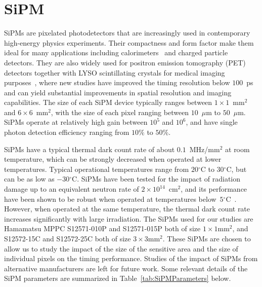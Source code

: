 \section{SiPM}
\label{sec:sipm}

SiPMs are pixelated photodetectors that are increasingly
used in contemporary high-energy physics experiments. Their compactness and form
factor make them ideal for many applications including calorimeters~\cite{Andreev:2004uy}
and charged particle detectors. They are also widely used for positron emission tomography
(PET) detectors together with LYSO scintillating crystals for medical imaging
purposes~\cite{Vandenberghe2016}, where new studies have improved the 
timing resolution below $100$~ps~\cite{LecoqTOFPET} and 
 can yield substantial improvements in spatial resolution and imaging 
 capabilities. The size of each SiPM device typically
ranges between $1\times 1$~$\mathrm{mm}^{2}$ and $6\times 6$~$\mathrm{mm}^{2}$,
with the size of each pixel ranging between $10$~$\mu$m to $50$~$\mu$m. SiPMs operate
at relatively high gain between $10^{5}$ and $10^{6}$, and have single photon detection
efficiency ranging from $10\%$ to $50\%$. 


SiPMs have a typical thermal dark count rate of about
$0.1$~MHz/$\mathrm{mm}^{2}$ at room temperature, which can be strongly decreased
when operated at lower temperatures. Typical operational temperatures range from
$20$$^{\circ}$C to $30$$^{\circ}$C, but can be as low as $-30$$^{\circ}$C. SiPMs have
been tested for the impact of radiation damage up to an equivalent neutron rate
of $2\times10^{14}$~$\mathrm{cm}^{2}$, and its performance have been shown to be
robust when operated at temperatures 
below~$5$$^{\circ}$C~\cite{SiPMIrradiated1,SiPMIrradiated2}. However, when operated
at the same temperature, the thermal dark count rate increases significantly
with large irradiation. The SiPMs used for our studies are Hamamatsu MPPC
S12571-010P and S12571-015P both of size $1\times1\mathrm{mm}^{2}$, and
S12572-15C and S12572-25C both of size $3\times3\mathrm{mm}^{2}$. These SiPMs
are chosen to allow us to study the impact of the size of the sensitive area and
the size of individual pixels on the timing performance. Studies of the impact
of SiPMs from alternative manufacturers are left for future work. Some relevant
details of the SiPM parameters are summarized in Table~\ref{tab:SiPMParameters}
below.


